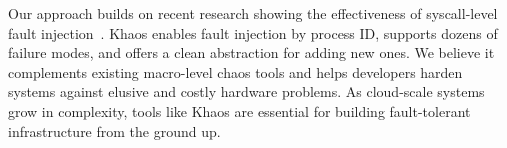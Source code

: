 Our approach builds on recent research showing the effectiveness of syscall-level fault injection~\cite{Zhang2020phoebe}. Khaos enables fault injection by process ID, supports dozens of failure modes, and offers a clean abstraction for adding new ones. We believe it complements existing macro-level chaos tools and helps developers harden systems against elusive and costly hardware problems. As cloud-scale systems grow in complexity, tools like Khaos are essential for building fault-tolerant infrastructure from the ground up.
